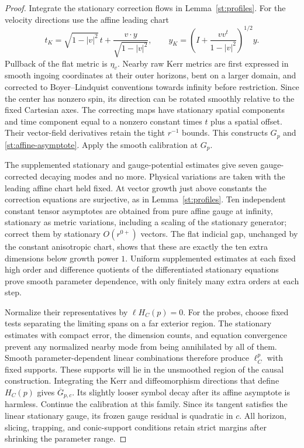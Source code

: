 \begin{proof}
Integrate the stationary correction flows in
Lemma~\ref{st:profiles}.  For the velocity directions use
the affine leading chart
\begin{equation}\label{st:affine-chart}
 t_K=\sqrt{1-|v|^2}\,t+
              \frac{v\cdot y}{\sqrt{1-|v|^2}},
 \qquad
 y_K=\left(I+\frac{vv^t}{1-|v|^2}\right)^{1/2}y.
\end{equation}
Pullback of the flat metric is $\eta_v$.  Nearby raw Kerr
metrics are first expressed in smooth ingoing coordinates at
their outer horizons, bent on a larger domain, and corrected
to Boyer--Lindquist conventions towards infinity before
restriction.  Since the center has nonzero spin, its direction
can be rotated smoothly relative to the fixed Cartesian axes.
The correcting maps have stationary spatial components and
time component equal to a nonzero constant times $t$ plus a
spatial offset.  Their vector-field derivatives retain the
tight $r^{-1}$ bounds.  This constructs $G_p$ and
\eqref{st:affine-asymptote}.  Apply the smooth calibration at
$G_p$.

The supplemented stationary and gauge-potential estimates give
seven gauge-corrected decaying modes and no more.  Physical
variations are taken with the leading affine chart held fixed.
At vector growth just above constants the correction equations
are surjective, as in Lemma~\ref{st:profiles}.
Ten independent constant tensor asymptotes are obtained from
pure affine gauge at infinity, stationary as metric variations,
including a scaling of the stationary generator; correct them
by stationary $O(r^{0+})$ vectors.  The flat indicial gap,
unchanged by the constant anisotropic chart, shows that these
are exactly the ten extra dimensions below growth power $1$.
Uniform supplemented estimates at each fixed high order and
difference quotients of the differentiated stationary equations
prove smooth parameter dependence, with only finitely many
extra orders at each step.

Normalize their representatives by $\ell H_C(p)=0$.
For the probes, choose fixed tests separating the limiting
spans on a far exterior region.  The stationary estimates with
compact error, the dimension counts, and equation convergence
prevent any normalized nearby mode from being annihilated by
all of them.  Smooth parameter-dependent linear combinations
therefore produce $\ell_C^p$ with fixed supports.
These supports will lie in the unsmoothed region of the causal
construction.  Integrating the Kerr and diffeomorphism
directions that define $H_C(p)$ gives
$\overline G_{p,c}$.  Its slightly looser symbol decay after
its affine asymptote is harmless.  Continue the calibration
at this family.  Since its tangent satisfies the linear
stationary gauge, its frozen gauge residual is quadratic in
$c$.  All horizon, slicing, trapping, and conic-support
conditions retain strict margins after shrinking the parameter
range.
\end{proof}

